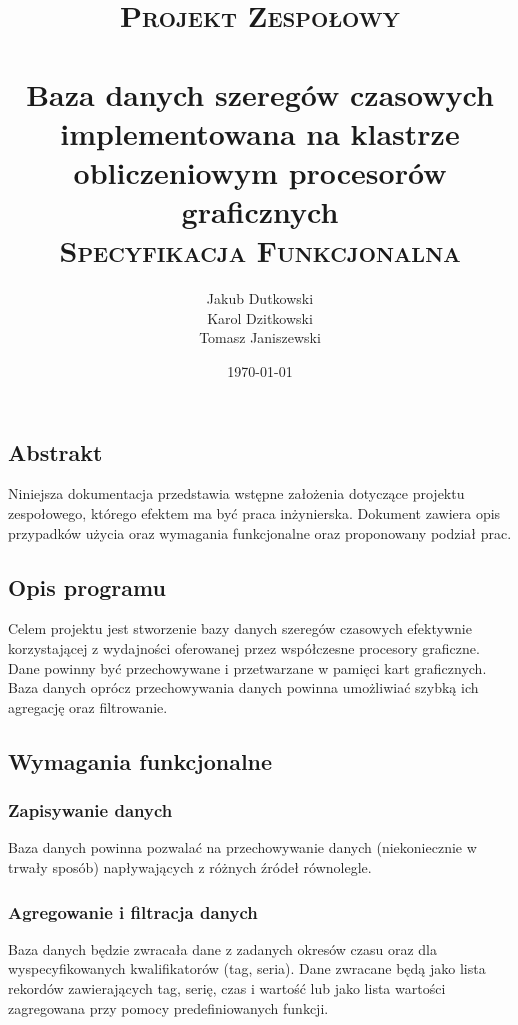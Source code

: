 \documentclass[paper=a4, fontsize=11pt]{scrartcl} %
\title{
\vspace*{\fill}
\normalfont
\textsc{Projekt Zespołowy}\\ [20pt]
\horrule{1.5pt} \\[0.4cm] %
\LARGE Baza danych szeregów czasowych implementowana na klastrze obliczeniowym procesorów graficznych
\horrule{1.5pt} \\[0.1cm] %
\normalsize
\textsc{Specyfikacja Funkcjonalna} \\ [20pt]
\vspace*{\fill}
}
\author{Jakub Dutkowski \\ Karol Dzitkowski \\ Tomasz Janiszewski } %
\date{\normalsize\today} %
\numberwithin{equation}{section} %
\numberwithin{figure}{section} %
\numberwithin{table}{section} %
\begin{document}
\maketitle

\thispagestyle{empty}
\clearpage

\tableofcontents
\listoffigures

\chapter{}

\clearpage

\vspace{4em}


\section{Abstrakt}
Niniejsza dokumentacja przedstawia wstępne założenia dotyczące projektu zespołowego, którego efektem ma być praca inżynierska.
Dokument zawiera opis przypadków użycia oraz wymagania funkcjonalne oraz proponowany podział prac.

\section{Opis programu}
Celem projektu jest stworzenie bazy danych szeregów czasowych efektywnie korzystającej z wydajności oferowanej przez współczesne
procesory graficzne. Dane powinny być przechowywane i przetwarzane w pamięci kart graficznych. Baza danych oprócz przechowywania
danych powinna umożliwiać szybką ich agregację oraz filtrowanie.

\section{Wymagania funkcjonalne}
    \subsection{Zapisywanie danych}
    Baza danych powinna pozwalać na przechowywanie danych (niekoniecznie w trwały sposób) napływających z różnych źródeł
    równolegle.
    \subsection{Agregowanie i filtracja danych}
    Baza danych będzie zwracała dane z zadanych okresów czasu oraz dla wyspecyfikowanych kwalifikatorów (tag, seria). Dane zwracane będą jako lista rekordów zawierających tag, serię, czas i wartość lub jako lista wartości zagregowana przy pomocy predefiniowanych funkcji.
\end{document}
